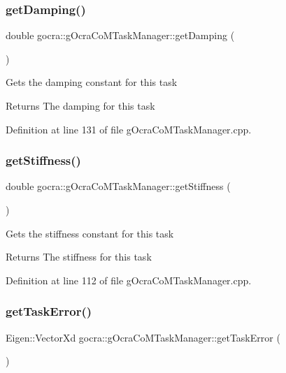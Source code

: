 \subsubsection{\texorpdfstring{get\+Damping()}{getDamping()}}
{\footnotesize\ttfamily double gocra\+::g\+Ocra\+Co\+M\+Task\+Manager\+::get\+Damping (\begin{DoxyParamCaption}{ }\end{DoxyParamCaption})}

Gets the damping constant for this task

\begin{DoxyReturn}{Returns}
The damping for this task 
\end{DoxyReturn}


Definition at line 131 of file g\+Ocra\+Co\+M\+Task\+Manager.\+cpp.

\hypertarget{classgocra_1_1gOcraCoMTaskManager_afc838311dae748d89ef76749192b2153}{}\label{classgocra_1_1gOcraCoMTaskManager_afc838311dae748d89ef76749192b2153} 
\subsubsection{\texorpdfstring{get\+Stiffness()}{getStiffness()}}
{\footnotesize\ttfamily double gocra\+::g\+Ocra\+Co\+M\+Task\+Manager\+::get\+Stiffness (\begin{DoxyParamCaption}{ }\end{DoxyParamCaption})}

Gets the stiffness constant for this task

\begin{DoxyReturn}{Returns}
The stiffness for this task 
\end{DoxyReturn}


Definition at line 112 of file g\+Ocra\+Co\+M\+Task\+Manager.\+cpp.

\hypertarget{classgocra_1_1gOcraCoMTaskManager_a48cd88dc2fa3db834d3d4a17d39a8c30}{}\label{classgocra_1_1gOcraCoMTaskManager_a48cd88dc2fa3db834d3d4a17d39a8c30} 
\subsubsection{\texorpdfstring{get\+Task\+Error()}{getTaskError()}}
{\footnotesize\ttfamily Eigen\+::\+Vector\+Xd gocra\+::g\+Ocra\+Co\+M\+Task\+Manager\+::get\+Task\+Error (\begin{DoxyParamCaption}{ }\end{DoxyParamCaption})\hspace{0.3cm}{\ttfamily [virtual]}}

